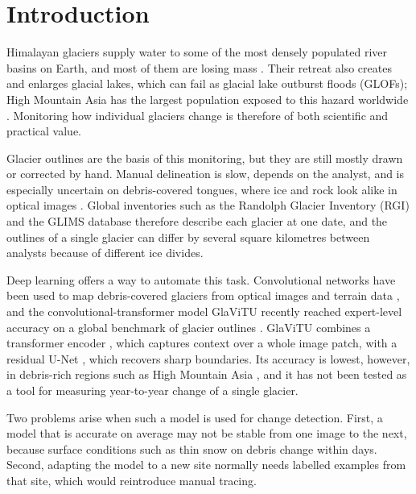 \documentclass[pdflatex,sn-mathphys-num]{sn-jnl}%
\theoremstyle{thmstyleone}%
\theoremstyle{thmstyletwo}%
\theoremstyle{thmstylethree}%
\begin{document}
\maketitle

\section{Introduction}\label{sec1}

Himalayan glaciers supply water to some of the most densely populated river basins on Earth, and most of them are losing mass \cite{bolch2012,hugonnet2021}. Their retreat also creates and enlarges glacial lakes, which can fail as glacial lake outburst floods (GLOFs); High Mountain Asia has the largest population exposed to this hazard worldwide \cite{taylor2023}. Monitoring how individual glaciers change is therefore of both scientific and practical value.

Glacier outlines are the basis of this monitoring, but they are still mostly drawn or corrected by hand. Manual delineation is slow, depends on the analyst, and is especially uncertain on debris-covered tongues, where ice and rock look alike in optical images \cite{paul2013,scherler2011}. Global inventories such as the Randolph Glacier Inventory (RGI) \cite{rgi6,rgi7} and the GLIMS database \cite{raup2007} therefore describe each glacier at one date, and the outlines of a single glacier can differ by several square kilometres between analysts because of different ice divides.

Deep learning offers a way to automate this task. Convolutional networks have been used to map debris-covered glaciers from optical images and terrain data \cite{xie2020}, and the convolutional-transformer model GlaViTU recently reached expert-level accuracy on a global benchmark of glacier outlines \cite{maslov2025}. GlaViTU combines a transformer encoder \cite{dosovitskiy2021,zheng2021}, which captures context over a whole image patch, with a residual U-Net \cite{ronneberger2015,he2016}, which recovers sharp boundaries. Its accuracy is lowest, however, in debris-rich regions such as High Mountain Asia \cite{maslov2025}, and it has not been tested as a tool for measuring year-to-year change of a single glacier.

Two problems arise when such a model is used for change detection. First, a model that is accurate on average may not be stable from one image to the next, because surface conditions such as thin snow on debris change within days. Second, adapting the model to a new site normally needs labelled examples from that site, which would reintroduce manual tracing.
\end{document}
